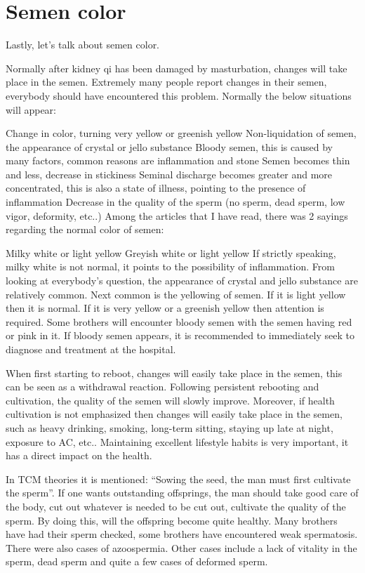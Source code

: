 \documentclass[
]{book}
\begin{document}
\hypertarget{semen-color}{%
\section{Semen color}\label{semen-color}}

Lastly, let's talk about semen color.

Normally after kidney qi has been damaged by masturbation, changes will take place in the semen. Extremely many people report changes in their semen, everybody should have encountered this problem. Normally the below situations will appear:

Change in color, turning very yellow or greenish yellow
Non-liquidation of semen, the appearance of crystal or jello substance
Bloody semen, this is caused by many factors, common reasons are inflammation and stone
Semen becomes thin and less, decrease in stickiness
Seminal discharge becomes greater and more concentrated, this is also a state of illness, pointing to the presence of inflammation
Decrease in the quality of the sperm (no sperm, dead sperm, low vigor, deformity, etc..)
Among the articles that I have read, there was 2 sayings regarding the normal color of semen:

Milky white or light yellow
Greyish white or light yellow
If strictly speaking, milky white is not normal, it points to the possibility of inflammation. From looking at everybody's question, the appearance of crystal and jello substance are relatively common. Next common is the yellowing of semen. If it is light yellow then it is normal. If it is very yellow or a greenish yellow then attention is required. Some brothers will encounter bloody semen with the semen having red or pink in it. If bloody semen appears, it is recommended to immediately seek to diagnose and treatment at the hospital.

When first starting to reboot, changes will easily take place in the semen, this can be seen as a withdrawal reaction. Following persistent rebooting and cultivation, the quality of the semen will slowly improve. Moreover, if health cultivation is not emphasized then changes will easily take place in the semen, such as heavy drinking, smoking, long-term sitting, staying up late at night, exposure to AC, etc.. Maintaining excellent lifestyle habits is very important, it has a direct impact on the health.

In TCM theories it is mentioned: ``Sowing the seed, the man must first cultivate the sperm''. If one wants outstanding offsprings, the man should take good care of the body, cut out whatever is needed to be cut out, cultivate the quality of the sperm. By doing this, will the offspring become quite healthy. Many brothers have had their sperm checked, some brothers have encountered weak spermatosis. There were also cases of azoospermia. Other cases include a lack of vitality in the sperm, dead sperm and quite a few cases of deformed sperm.
\end{document}
